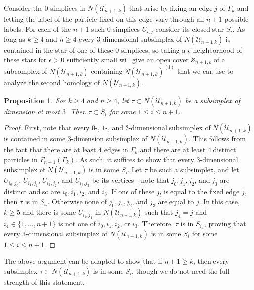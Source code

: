 \documentclass[pagebackref,colorlinks,citecolor=blue,linkcolor=blue,urlcolor=blue,filecolor=blue]{article}
\newtheorem{prop}[thm]{Proposition}
\theoremstyle{definition}\newtheorem{definition}[thm]{Definition}
\theoremstyle{definition}
\begin{document}
Consider the $0$-simplices in $N(\mathcal{U}_{n+1, k})$ that arise by fixing an edge $j$ of $\Gamma_{k}$ and letting the label of the particle fixed on this edge vary through all $n+1$ possible labels.
For each of the $n+1$ such $0$-simplices $U_{i,j}$ consider its closed star $S_{i}$. 
As long as $k\ge 4$ and $n\ge 4$ every $3$-dimensional subsimplex of $N(\mathcal{U}_{n+1, k})$ is contained in the star of one of these $0$-simplices, so taking a $\epsilon$-neighborhood of these stars for $\epsilon>0$ sufficiently small will give an open cover $\mathcal{S}_{n+1, k}$ of a subcomplex of $N(\mathcal{U}_{n+1, k})$ containing $N(\mathcal{U}_{n+1, k})^{(3)}$ that we can use to analyze the second homology of $N(\mathcal{U}_{n+1, k})$.

\begin{prop}\label{stars contain everything}
For $k\ge 4$ and $n\ge 4$, let $\tau\subset N(\mathcal{U}_{n+1, k})$ be a subsimplex of dimension at most $3$.
Then $\tau\subset S_{i}$ for some $1\le i\le n+1$.
\end{prop}

\begin{proof}
First, note that every $0$-, $1$-, and $2$-dimensional subsimplex of $N(\mathcal{U}_{n+1, k})$ is contained in some $3$-dimension subsimplex of $N(\mathcal{U}_{n+1, k})$.
This follows from the fact that there are at least $4$ edges in $\Gamma_{k}$ and there are at least $4$ distinct particles in $F_{n+1}(\Gamma_{k})$.
As such, it suffices to show that every $3$-dimensional subsimplex of $N(\mathcal{U}_{n+1, k})$ is in some $S_{i}$.
Let $\tau$ be such a subsimplex, and let $U_{i_{0}, j_{0}}$, $U_{i_{1}, j_{1}}$, $U_{i_{2}, j_{2}}$, and $U_{i_{3}, j_{3}}$ be its vertices---note that $j_{0}, j_{1}, j_{2}$, and $j_{3}$ are distinct and so are $i_{0}, i_{1}, i_{2}$, and $i_{3}$.
If one of these $j_{l}$ is equal to the fixed edge $j$, then $\tau$ is in $S_{i_{l}}$.
Otherwise none of $j_{0}, j_{1}, j_{2}$, and $j_{3}$ are equal to $j$.
In this case, $k\ge 5$ and there is some $U_{i_{4}, j_{4}}$ in $N(\mathcal{U}_{n+1, k})$ such that $j_{4}=j$ and $i_{4}\in \{1, \dots, n+1\}$ is not one of $i_{0}, i_{1}, i_{2}$, or $i_{3}$.
Therefore, $\tau$ is in $S_{i_{4}}$, proving that every $3$-dimensional subsimplex of $N(\mathcal{U}_{n+1, k})$ is in some $S_{i}$ for some $1\le i\le n+1$.
\end{proof}

The above argument can be adapted to show that if $n+1\ge k$, then every subsimplex $\tau\subset N(\mathcal{U}_{n+1, k})$ is in some $S_{i}$, though we do not need the full strength of this statement.
\end{document}
